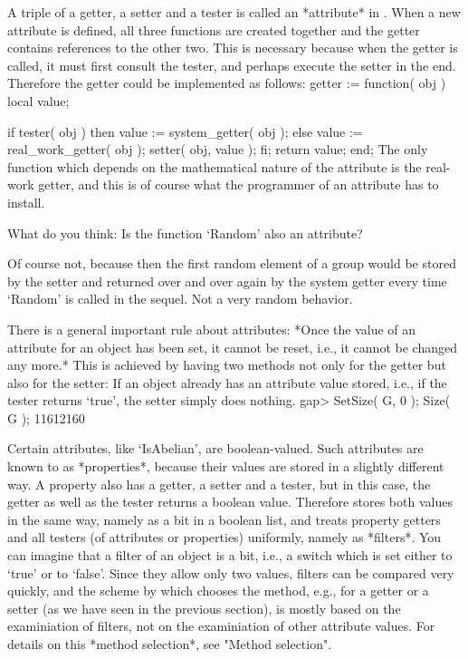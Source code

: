 A triple of a getter,  a setter and a tester  is called an *attribute* in
{\GAP}. When a new attribute is  defined, all three functions are created
together  and the getter contains  references to  the  other two. This is
necessary because when the  getter is called,  it must first consult  the
tester,  and perhaps execute the setter  in the end. Therefore the getter
could be implemented as follows:
\begintt
    getter := function( obj )
        local   value;

        if tester( obj )  then
            value := system_getter( obj );
        else
            value := real_work_getter( obj );
            setter( obj, value );
        fi;
        return value;
    end;
\endtt
The  only  function which depends  on  the   mathematical  nature of  the
attribute  is  the real-work  getter, and  this  is of   course  what the
programmer of an attribute has to install.

\exercise  What  do you think:  Is  the {\GAP} function  `Random' also an
attribute?

\answer Of course  not, because then the  first random element of a group
would be stored by  the setter and returned over  and  over again by  the
system getter every  time `Random' is  called in  the sequel.  Not a very
random behavior.

There is a general important rule about attributes: *Once the value of an
attribute for an object has been set, it cannot be reset, i.e., it cannot
be changed any more.* This is achieved by having two methods not only for
the getter but also for the setter: If an object already has an attribute
value stored, i.e., if the tester returns `true',  the setter simply does
nothing.
\beginexample
    gap> SetSize( G, 0 ); Size( G );
    11612160
\endexample

\null

%
Certain attributes, like `IsAbelian', are boolean-valued. Such attributes
are known to {\GAP} as *properties*, because their values are stored in a
slightly  different  way. A property  also has  a getter,  a setter and a
tester, but in this  case,  the getter as  well as  the tester returns  a
boolean value.  Therefore {\GAP} stores   both  values in  the same  way,
namely as a bit  in a boolean  list, and treats  property getters and all
testers (of attributes or properties) uniformly, namely as *filters*. You
can imagine that a filter of an object is a bit,  i.e., a switch which is
set either to `true' or  to `false'.  Since they  allow only two  values,
filters  can  be compared very  quickly, and  the  scheme by which {\GAP}
chooses  the method, e.g., for a  getter or a  setter (as we have seen in
the  previous section), is mostly based  on  the examiniation of filters,
not on  the examiniation of  other attribute values.  For details on this
*method selection*, see "Method selection".


